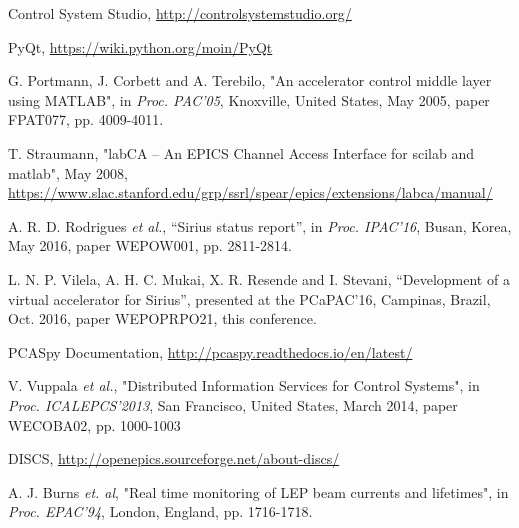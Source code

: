 \documentclass[a4paper,
              ]{jacow}
\begin{document}
\begin{thebibliography}{99}

		Control System Studio, \url{http://controlsystemstudio.org/}
		
		PyQt, \url{https://wiki.python.org/moin/PyQt}
		
		 G. Portmann, J. Corbett and A. Terebilo,
		 "An accelerator control middle layer using MATLAB",
		 in \emph{Proc. PAC'05},
		 Knoxville, United States, May 2005,
		 paper FPAT077, pp. 4009-4011.
		 
		T. Straumann,
		"labCA -- An EPICS Channel Access Interface for scilab and matlab",
		May 2008,
		\url{https://www.slac.stanford.edu/grp/ssrl/spear/epics/extensions/labca/manual/}

		A. R. D. Rodrigues \emph{et al.}, 
		“Sirius status report”, 
		in \emph{Proc. IPAC'16}, 
		Busan, Korea, May 2016, 
		paper WEPOW001, pp. 2811-2814.
		
		L. N. P. Vilela, A. H. C. Mukai, X. R. Resende and I. Stevani, 
		“Development of a virtual accelerator for Sirius”, 
		presented at the PCaPAC'16, 
		Campinas, Brazil, Oct. 2016, 
		paper WEPOPRPO21, this conference.
		
		PCASpy Documentation, \url{http://pcaspy.readthedocs.io/en/latest/}
		
		V. Vuppala \emph{et al.},
		"Distributed Information Services for Control Systems",
		in \emph{Proc. ICALEPCS'2013},
		San Francisco, United States, March 2014,
		paper WECOBA02, pp. 1000-1003
	
		DISCS, \url{http://openepics.sourceforge.net/about-discs/}
		
	 	A. J. Burns \emph{et. al},
	 	"Real time monitoring of LEP beam currents and lifetimes",
	 	in \emph{Proc. EPAC'94},
	 	London, England, pp. 1716-1718.
		
\end{thebibliography}
\end{document}
